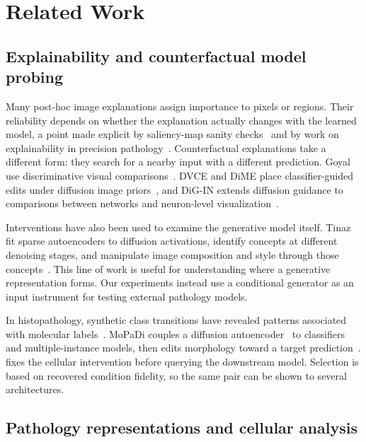 \section{Related Work}
\label{sec:related}

\subsection{Explainability and counterfactual model probing}

Many post-hoc image explanations assign importance to pixels or regions. Their reliability depends on whether the explanation actually changes with the learned model, a point made explicit by saliency-map sanity checks~\cite{adebayo2018sanity} and by work on explainability in precision pathology~\cite{klauschen2024xai}. Counterfactual explanations take a different form: they search for a nearby input with a different prediction. Goyal \etal{} use discriminative visual comparisons~\cite{goyal2019counterfactual}. DVCE and DiME place classifier-guided edits under diffusion image priors~\cite{augustin2022dvce,jeanneret2022dime}, and DiG-IN extends diffusion guidance to comparisons between networks and neuron-level visualization~\cite{augustin2024digin}.

Interventions have also been used to examine the generative model itself. Tinaz \etal{} fit sparse autoencoders to diffusion activations, identify concepts at different denoising stages, and manipulate image composition and style through those concepts~\cite{tinaz2025concepts}. This line of work is useful for understanding where a generative representation forms. Our experiments instead use a conditional generator as an input instrument for testing external pathology models.

In histopathology, synthetic class transitions have revealed patterns associated with molecular labels~\cite{dolezal2023synthetic}. MoPaDi couples a diffusion autoencoder~\cite{preechakul2022diffae} to classifiers and multiple-instance models, then edits morphology toward a target prediction~\cite{zigutyte2026mopadi}. \method{} fixes the cellular intervention before querying the downstream model. Selection is based on recovered condition fidelity, so the same pair can be shown to several architectures.

\subsection{Pathology representations and cellular analysis}

